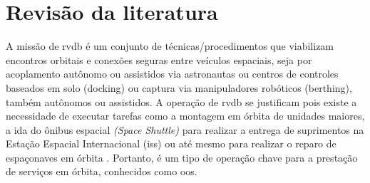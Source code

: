 \section{Revisão da literatura}

A missão de \gls{rvdb} é um conjunto de técnicas/procedimentos que viabilizam encontros orbitais e conexões seguras entre veículos espaciais, seja por acoplamento autônomo ou assistidos via astronautas ou centros de controles baseados em solo (docking) ou captura via manipuladores robóticos (berthing), também autônomos ou assistidos.
A operação de \gls{rvdb} se justificam pois existe a necessidade de executar tarefas como a montagem em órbita de unidades maiores, a ida do ônibus espacial \emph{(Space Shuttle)} para realizar a entrega de suprimentos na Estação Espacial Internacional (\gls{iss}) ou até mesmo para realizar o reparo de espaçonaves em órbita \cite{fehse2003}.
Portanto, é um tipo de operação chave para a prestação de serviços em órbita, conhecidos como \gls{oos}.




